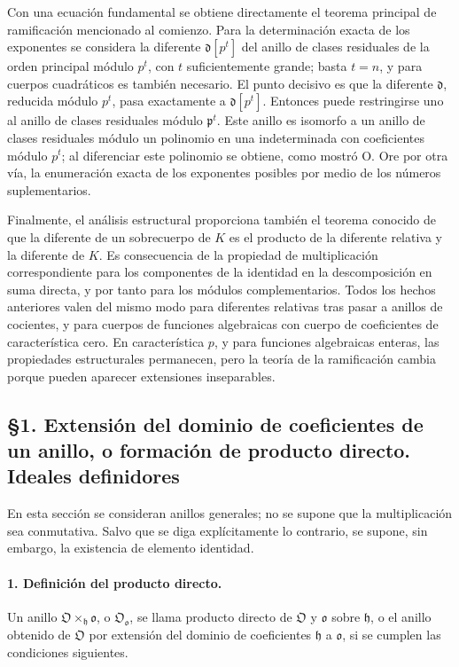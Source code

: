 \documentclass[11pt]{article}
\begin{document}
Con una ecuación fundamental se obtiene directamente el teorema principal de ramificación mencionado al comienzo. Para la determinación exacta de los exponentes se considera la diferente $\mathfrak d[p^t]$ del anillo de clases residuales de la orden principal módulo $p^t$, con $t$ suficientemente grande; basta $t=n$, y para cuerpos cuadráticos es también necesario. El punto decisivo es que la diferente $\mathfrak d$, reducida módulo $p^t$, pasa exactamente a $\mathfrak d[p^t]$. Entonces puede restringirse uno al anillo de clases residuales módulo $\mathfrak p^t$. Este anillo es isomorfo a un anillo de clases residuales módulo un polinomio en una indeterminada con coeficientes módulo $p^t$; al diferenciar este polinomio se obtiene, como mostró O. Ore por otra vía, la enumeración exacta de los exponentes posibles por medio de los números suplementarios.

Finalmente, el análisis estructural proporciona también el teorema conocido de que la diferente de un sobrecuerpo de $K$ es el producto de la diferente relativa y la diferente de $K$. Es consecuencia de la propiedad de multiplicación correspondiente para los componentes de la identidad en la descomposición en suma directa, y por tanto para los módulos complementarios. Todos los hechos anteriores valen del mismo modo para diferentes relativas tras pasar a anillos de cocientes, y para cuerpos de funciones algebraicas con cuerpo de coeficientes de característica cero. En característica $p$, y para funciones algebraicas enteras, las propiedades estructurales permanecen, pero la teoría de la ramificación cambia porque pueden aparecer extensiones inseparables.

\subsection*{§1. Extensión del dominio de coeficientes de un anillo, o formación de producto directo. Ideales definidores}

En esta sección se consideran anillos generales; no se supone que la multiplicación sea conmutativa. Salvo que se diga explícitamente lo contrario, se supone, sin embargo, la existencia de elemento identidad.

\paragraph{1. Definición del producto directo.}
Un anillo $\mathfrak O\times_{\mathfrak h}\mathfrak o$, o $\mathfrak O_{\mathfrak o}$, se llama producto directo de $\mathfrak O$ y $\mathfrak o$ sobre $\mathfrak h$, o el anillo obtenido de $\mathfrak O$ por extensión del dominio de coeficientes $\mathfrak h$ a $\mathfrak o$, si se cumplen las condiciones siguientes.
\end{document}
